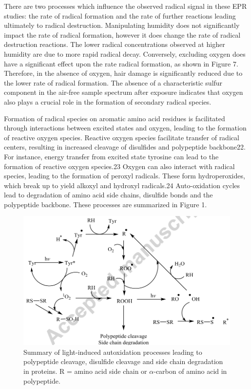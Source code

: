 \documentclass[]{interact}
\theoremstyle{plain}%
\theoremstyle{definition}
\theoremstyle{remark}
\begin{document}
There are two processes which influence the observed radical signal in these EPR studies: the rate of radical formation and the rate of further reactions leading ultimately to radical destruction. Manipulating humidity does not significantly impact the rate of radical formation, however it does change the rate of radical destruction reactions. The lower radical concentrations observed at higher humidity are due to more rapid radical decay. Conversely, excluding oxygen does have a significant effect upon the rate radical formation, as shown in Figure 7. Therefore, in the absence of oxygen, hair damage is significantly reduced due to the lower rate of radical formation. The absence of a characteristic sulfur component in the air-free sample spectrum after exposure indicates that oxygen also plays a crucial role in the formation of secondary radical species.

Formation of radical species on aromatic amino acid residues is facilitated through interactions between excited states and oxygen, leading to the formation of reactive oxygen species. Reactive oxygen species facilitate transfer of radical centers, resulting in increased cleavage of disulfides and polypeptide backbone22. For instance, energy transfer from excited state tyrosine can lead to the formation of reactive oxygen species.23 Oxygen can also interact with radical species, leading to the formation of peroxyl radicals. These form hydroperoxides, which break up to yield alkoxyl and hydroxyl radicals.24 Auto-oxidation cycles lead to degradation of amino acid side chains, disulfide bonds and the polypeptide backbone. These processes are summarized in Figure 1.

\begin{figure}
	\includegraphics[width=\textwidth]{fig1.png} 
	\caption{Summary of light-induced autoxidation processes leading to polypeptide cleavage, disulfide cleavage and side chain degradation in proteins. R = amino acid side chain or $\alpha$-carbon of amino acid in polypeptide.}
	\label{OxidationProcess}
\end{figure}
\end{document}
